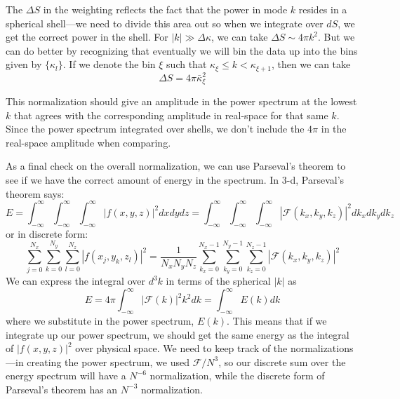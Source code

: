 \documentclass[11pt]{article}
\begin{document}
The $\Delta S$ in the weighting reflects the fact that the power 
in mode $k$ resides in a spherical shell---we need to divide this
area out so when we integrate over $dS$, we get the correct power
in the shell.  For $|k| \gg \Delta \kappa$, we can take $\Delta S \sim
4\pi k^2$.  But we can do better by recognizing that eventually we
will bin the data up into the bins given by $\{\kappa_l\}$.  If we
denote the bin $\xi$ such that $\kappa_\xi \le k < \kappa_{\xi+1}$,
then we can take
\begin{equation}
\Delta S = 4 \pi \bar{\kappa}_\xi^2
\end{equation}

This normalization should give an amplitude in the power spectrum at the lowest
$k$ that agrees with the corresponding amplitude in real-space for that same $k$.  
Since the power spectrum integrated over shells, we don't include the $4\pi$
in the real-space amplitude when comparing. 

As a final check on the overall normalization, we can use Parseval's theorem
to see if we have the correct amount of energy in the spectrum.  In 3-d,
Parseval's theorem says:
\begin{equation}
E = \int_{-\infty}^{\infty} \int_{-\infty}^{\infty} \int_{-\infty}^{\infty} |f(x,y,z)|^2 dx dy dz = 
  \int_{-\infty}^{\infty} \int_{-\infty}^{\infty} \int_{-\infty}^{\infty}  |\mathcal{F}(k_x,k_y,k_z)|^2 dk_x dk_y dk_z
\end{equation}
or in discrete form:
\begin{equation}
\sum_{j=0}^{N_x} \sum_{k=0}^{N_y} \sum_{l=0}^{N_z}
   | f(x_j, y_k, z_l) |^2 = \frac{1}{N_x N_y N_z} 
 \sum_{k_x=0}^{N_x-1} \sum_{k_y=0}^{N_y-1} \sum_{k_z=0}^{N_z-1} 
   | \mathcal{F}(k_x, k_y, k_z) |^2
\end{equation}
We can express the integral over $d^3k$ in terms of the spherical $|k|$ as
\begin{equation}
E = 4\pi \int_{-\infty}^{\infty} |\mathcal{F}(k)|^2 k^2 dk = \int_{-\infty}^{\infty} E(k) dk
\end{equation}
where we substitute in the power spectrum, $E(k)$.  This means that if we integrate up our
power spectrum, we should get the same energy as the integral
of $|f(x,y,z)|^2$ over physical space.  We need to keep track of the normalizations---in
creating the power spectrum, we used $\mathcal{F}/N^3$, so our discrete sum over the energy
spectrum will have a $N^{-6}$ normalization, while the discrete form of Parseval's theorem
has an $N^{-3}$ normalization.
\end{document}
